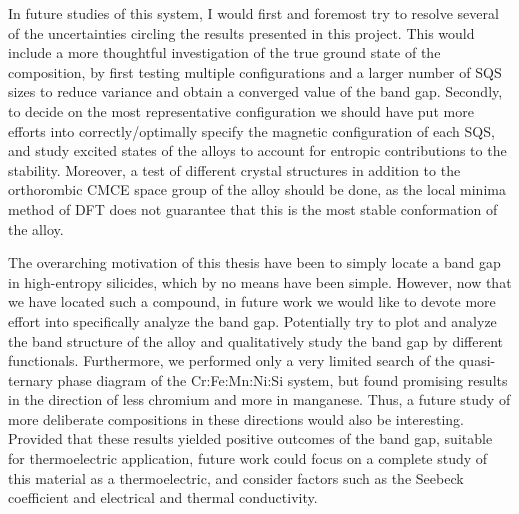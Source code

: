 \documentclass[UKenglish]{ifimaster}  %
\begin{document}
In future studies of this system, I would first and foremost try to resolve several of the uncertainties circling the results presented in this project. This would include a more thoughtful investigation of the true ground state of the  composition, by first testing multiple configurations and a larger number of SQS sizes to reduce variance and obtain a converged value of the band gap. Secondly, to decide on the most representative configuration we should have put more efforts into correctly/optimally specify the magnetic configuration of each SQS, and study excited states of the alloys to account for entropic contributions to the stability.  Moreover, a test of different crystal structures in addition to the orthorombic CMCE space group of the  alloy should be done, as the local minima method of DFT does not guarantee that this is the most stable conformation of the alloy.

The overarching motivation of this thesis have been to simply locate a band gap in high-entropy silicides, which by no means have been simple. However, now that we have located such a compound, in future work we would like to devote more effort into specifically analyze the band gap. Potentially try to plot and analyze the band structure of the alloy and qualitatively study the band gap by different functionals. Furthermore, we performed only a very limited search of the quasi-ternary phase diagram of the Cr:Fe:Mn:Ni:Si system, but found promising results in the direction of less chromium and more in manganese. Thus, a future study of more deliberate compositions in these directions would also be interesting. Provided that these results yielded positive outcomes of the band gap, suitable for thermoelectric application, future work could focus on a complete study of this material as a thermoelectric, and consider factors such as the Seebeck coefficient and electrical and thermal conductivity. 


\appendix


\backmatter{}
\printbibliography
\end{document}
